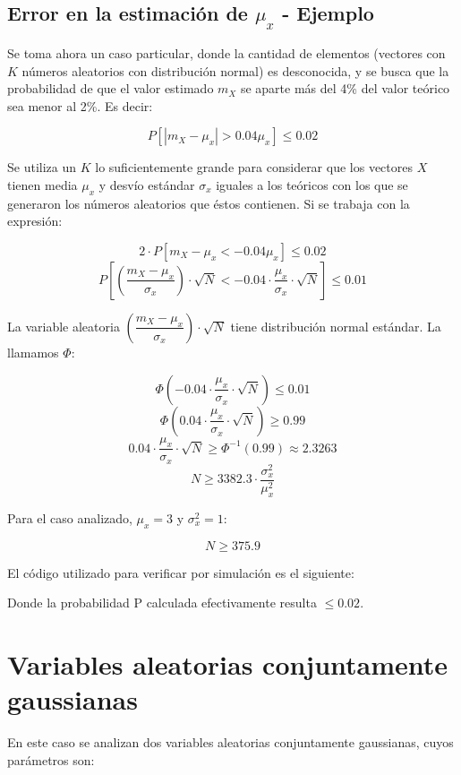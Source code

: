 \subsection{Error en la estimaci\'on de $\mu_x$ - Ejemplo}

Se toma ahora un caso particular, donde la cantidad de elementos (vectores con $K$ n\'umeros aleatorios con distribuci\'on normal) es desconocida, y se busca que la probabilidad de que el valor estimado $m_X$ se aparte m\'as del 4\% del valor te\'orico sea menor al 2\%. Es decir:

\[
P[|m_X - \mu_x| > 0.04\mu_x] \leq 0.02
\]

Se utiliza un $K$ lo suficientemente grande para considerar que los vectores $X$ tienen media $\mu_x$ y desv\'io est\'andar $\sigma_x$ iguales a los te\'oricos con los que se generaron los n\'umeros aleatorios que \'estos contienen. Si se trabaja con la expresi\'on:

\[
2 \cdot P[m_X - \mu_x < -0.04\mu_x] \leq 0.02
\]
\[
P\left[\left( \frac{m_X - \mu_x}{\sigma_x} \right) \cdot \sqrt{N} < -0.04 \cdot \frac{\mu_x}{\sigma_x} \cdot \sqrt{N}\right] \leq 0.01
\]

La variable aleatoria $\left( \dfrac{m_X - \mu_x}{\sigma_x} \right) \cdot \sqrt{N}$ tiene distribuci\'on normal est\'andar. La llamamos $\Phi$:

\[
\Phi \left( -0.04 \cdot \frac{\mu_x}{\sigma_x} \cdot \sqrt{N} \right) \leq 0.01
\]
\[
\Phi \left( 0.04 \cdot \frac{\mu_x}{\sigma_x} \cdot \sqrt{N} \right) \geq 0.99
\]
\[
0.04 \cdot \frac{\mu_x}{\sigma_x} \cdot \sqrt{N} \geq \Phi^{-1}(0.99) \approx 2.3263
\]
\[
N \geq 3382.3 \cdot \frac{\sigma^2_x}{\mu^2_x}
\]

Para el caso analizado, $\mu_x = 3$ y $\sigma^2_x = 1$:

\[
N \geq 375.9
\]

El c\'odigo utilizado para verificar por simulaci\'on es el siguiente:



Donde la probabilidad P calculada efectivamente resulta $\leq 0.02$.

\newpage

\section{Variables aleatorias conjuntamente gaussianas}

En este caso se analizan dos variables aleatorias conjuntamente gaussianas, cuyos par\'ametros son:

